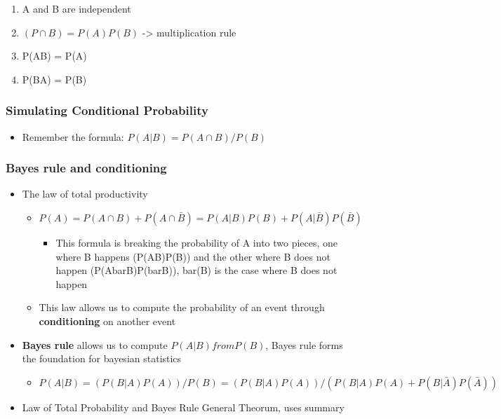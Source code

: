 \documentclass[
]{article}
\providecommand{\tightlist}{%
  \setlength{\itemsep}{0pt}\setlength{\parskip}{0pt}}
\begin{document}
\begin{enumerate}
\def\labelenumi{\arabic{enumi}.}
\tightlist
\item
  A and B are independent
\item
  \((P \cap B) = P(A)P(B)\) -\textgreater{} multiplication rule
\item
  P(A\textbar B) = P(A)
\item
  P(B\textbar A) = P(B)
\end{enumerate}

\hypertarget{simulating-conditional-probability}{%
\subsubsection{Simulating Conditional
Probability}\label{simulating-conditional-probability}}

\begin{itemize}
\tightlist
\item
  Remember the formula: \(P(A | B) = P(A \cap B) / P(B)\)
\end{itemize}

\hypertarget{bayes-rule-and-conditioning}{%
\subsubsection{Bayes rule and
conditioning}\label{bayes-rule-and-conditioning}}

\begin{itemize}
\tightlist
\item
  The law of total productivity

  \begin{itemize}
  \tightlist
  \item
    \(P(A) = P(A \cap B) + P(A \cap \bar B) = P(A|B)P(B) + P(A|\bar B)P(\bar B)\)

    \begin{itemize}
    \tightlist
    \item
      This formula is breaking the probability of A into two pieces, one
      where B happens (P(A\textbar B)P(B)) and the other where B does
      not happen (P(A\textbar barB)P(barB)), bar(B) is the case where B
      does not happen
    \end{itemize}
  \item
    This law allows us to compute the probability of an event through
    \textbf{conditioning} on another event
  \end{itemize}
\item
  \textbf{Bayes rule} allows us to compute \(P(A|B) from P(B)\), Bayes
  rule forms the foundation for bayesian statistics

  \begin{itemize}
  \tightlist
  \item
    \(P(A|B) = (P(B|A)P(A))/P(B) = (P(B|A)P(A))/(P(B|A)P(A) + P(B|\bar A)P(\bar A))\)
  \end{itemize}
\item
  Law of Total Probability and Bayes Rule General Theorum, uses summary
\end{itemize}
\end{document}
